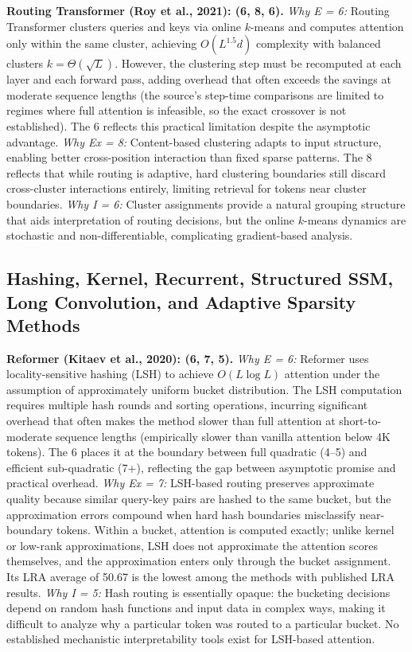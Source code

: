 \documentclass[10pt,twocolumn]{article}
\begin{document}
\textbf{Routing Transformer (Roy et al., 2021): (6, 8, 6).}
\textit{Why E = 6:} Routing Transformer clusters queries and keys via online $k$-means and computes attention only within the same cluster, achieving $O(L^{1.5} d)$ complexity with balanced clusters $k = \Theta(\sqrt{L})$. However, the clustering step must be recomputed at each layer and each forward pass, adding overhead that often exceeds the savings at moderate sequence lengths (the source's step-time comparisons are limited to regimes where full attention is infeasible, so the exact crossover is not established). The 6 reflects this practical limitation despite the asymptotic advantage. \textit{Why Ex = 8:} Content-based clustering adapts to input structure, enabling better cross-position interaction than fixed sparse patterns. The 8 reflects that while routing is adaptive, hard clustering boundaries still discard cross-cluster interactions entirely, limiting retrieval for tokens near cluster boundaries. \textit{Why I = 6:} Cluster assignments provide a natural grouping structure that aids interpretation of routing decisions, but the online $k$-means dynamics are stochastic and non-differentiable, complicating gradient-based analysis.

\subsection*{Hashing, Kernel, Recurrent, Structured SSM, Long Convolution, and Adaptive Sparsity Methods}

\textbf{Reformer (Kitaev et al., 2020): (6, 7, 5).}
\textit{Why E = 6:} Reformer uses locality-sensitive hashing (LSH) to achieve $O(L \log L)$ attention under the assumption of approximately uniform bucket distribution. The LSH computation requires multiple hash rounds and sorting operations, incurring significant overhead that often makes the method slower than full attention at short-to-moderate sequence lengths (empirically slower than vanilla attention below 4K tokens). The 6 places it at the boundary between full quadratic (4--5) and efficient sub-quadratic (7+), reflecting the gap between asymptotic promise and practical overhead. \textit{Why Ex = 7:} LSH-based routing preserves approximate quality because similar query-key pairs are hashed to the same bucket, but the approximation errors compound when hard hash boundaries misclassify near-boundary tokens. Within a bucket, attention is computed exactly; unlike kernel or low-rank approximations, LSH does not approximate the attention scores themselves, and the approximation enters only through the bucket assignment. Its LRA average of 50.67 is the lowest among the methods with published LRA results. \textit{Why I = 5:} Hash routing is essentially opaque: the bucketing decisions depend on random hash functions and input data in complex ways, making it difficult to analyze why a particular token was routed to a particular bucket. No established mechanistic interpretability tools exist for LSH-based attention.
\end{document}
